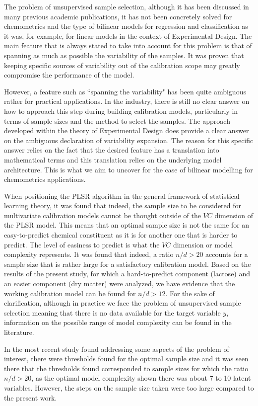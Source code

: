 \documentclass[journal=ancham,manuscript=article]{achemso}
\begin{document}
The problem of unsupervised sample selection, although it has been discussed in many previous academic publications, it has not been concretely solved for chemometrics and the type of bilinear models for regression and classification as it was, for example, for linear models in the context of Experimental Design. The main feature that is always stated to take into account for this problem is that of spanning as much as possible the variability of the samples. It was proven that keeping specific sources of variability out of the calibration scope may greatly compromise the performance of the model. 

However, a feature such as ``spanning the variability" has been quite ambiguous rather for practical applications. In the industry, there is still no clear answer on how to approach this step during building calibration models, particularly in terms of sample sizes and the method to select the samples. The approach developed within the theory of Experimental Design does provide a clear answer on the ambiguous declaration of variability expansion. The reason for this specific answer relies on the fact that the desired feature has a translation into mathematical terms and this translation relies on the underlying model architecture. This is what we aim to uncover for the case of bilinear modelling for chemometrics applications. 

When positioning the PLSR algorithm in the general framework of statistical learning theory, it was found that indeed, the sample size to be considered for multivariate calibration models cannot be thought outside of the $VC$ dimension of the PLSR model. This means that an optimal sample size is not the same for an easy-to-predict chemical constituent as it is for another one that is harder to predict. The level of easiness to predict is what the $VC$ dimension or model complexity represents. It was found that indeed, a ratio $n/d>20$ accounts for a sample size that is rather large for a satisfactory calibration model. Based on the results of the present study, for which a hard-to-predict component (lactose) and an easier component (dry matter) were analyzed, we have evidence that the working calibration model can be found for $n/d>12$. For the sake of clarification, although in practice we face the problem of unsupervised sample selection meaning that there is no data available for the target variable $y$, information on the possible range of model complexity can be found in the literature.

In the most recent study found addressing some aspects of the problem of interest, there were thresholds found for the optimal sample size and it was seen there that the thresholds found corresponded to sample sizes for which the ratio $n/d>20$, as the optimal model complexity shown there was about 7 to 10 latent variables. However, the steps on the sample size taken were too large compared to the present work. 
\end{document}
